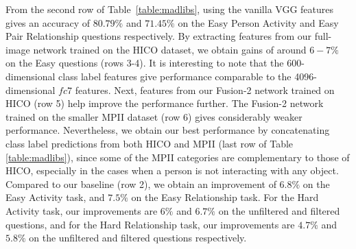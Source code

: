 \documentclass[runningheads]{llncs}
\begin{document}
From the second row of Table~\ref{table:madlibs}, using the vanilla VGG features gives an accuracy of $80.79\%$ and $71.45\%$ on the Easy Person Activity and Easy Pair Relationship questions respectively. By extracting features from our full-image network trained on the HICO dataset, we obtain gains of around $6-7\%$ on the Easy questions (rows 3-4). It is interesting to note that the 600-dimensional class label features give performance comparable to the 4096-dimensional $fc7$ features. Next, features from our Fusion-2 network trained on HICO (row 5) help improve the performance further. The Fusion-2 network trained on the smaller MPII dataset (row 6) gives considerably weaker performance. Nevertheless, we obtain our best performance by concatenating class label predictions from both HICO and MPII (last row of Table \ref{table:madlibs}), since some of the MPII categories are complementary to those of HICO, especially in the cases when a person is not interacting with any object. Compared to our baseline (row 2), we obtain an improvement of $6.8\%$ on the Easy Activity task, and $7.5\%$ on the Easy Relationship task. For the Hard Activity task, our improvements are $6\%$ and $6.7\%$ on the unfiltered and filtered questions, and for the Hard Relationship task, our improvements are $4.7\%$ and $5.8\%$ on the unfiltered and filtered questions respectively.
\end{document}
